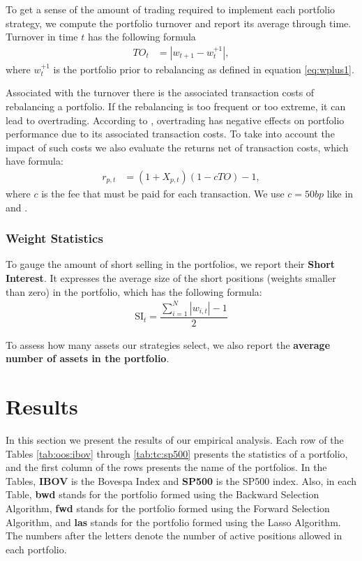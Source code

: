 \documentclass[preprint,authoryear,review,12pt]{elsarticle}
\begin{document}
To get a sense of the amount of trading required to implement each portfolio strategy, we compute the portfolio turnover and report its average through time.
Turnover in time $t$ has the following formula
\begin{align}
	\label{to}
	TO_{t} &= |w_{t+1} - w_{t}^{+1}|,
\end{align}
where $w_{t}^{+1}$ is the portfolio prior to rebalancing as defined in equation \eqref{eq:wplus1}.

Associated with the turnover there is the associated transaction costs of rebalancing a portfolio.
If the rebalancing is too frequent or too extreme, it can lead to overtrading.
According to \cite{barber-2000}, overtrading has negative effects on portfolio performance due to its associated transaction costs.
To take into account the impact of such costs we also evaluate the returns net of transaction costs, which have formula:
\begin{align}
	r_{p,t} &= (1 + X_{p,t} )(1 - c TO) - 1,
\end{align}
where $c$ is the fee that must be paid for each transaction.
We use $c=50bp$ like in \cite{dgu2009} and \cite{fko-2012}.

\subsubsection*{Weight Statistics}

To gauge the amount of short selling in the portfolios, we report their \textbf{Short Interest}.
It expresses the average size of the short positions (weights smaller than zero) in the portfolio, which has the following formula:
\begin{align}
	\text{SI}_{t} = \dfrac{\sum_{i=1}^{N} |w_{i,t}| - 1}{2}
\end{align}

To assess how many assets our strategies select, we also report the \textbf{average number of assets in the portfolio}.

\section{Results} \label{sec:results}

In this section we present the results of our empirical analysis.
Each row of the Tables \ref{tab:oos:ibov} through \ref{tab:tc:sp500} presents the statistics of a portfolio, and the first column of the rows presents the name of the portfolios.
In the Tables, \textbf{IBOV} is the Bovespa Index and \textbf{SP500} is the SP500 index. 
Also, in each Table,
\textbf{bwd} stands for the portfolio formed using the Backward Selection Algorithm, 
\textbf{fwd} stands for the portfolio formed using the Forward Selection Algorithm, and
\textbf{las} stands for the portfolio formed using the Lasso Algorithm.
The numbers after the letters denote the number of active positions allowed in each portfolio.
\end{document}
